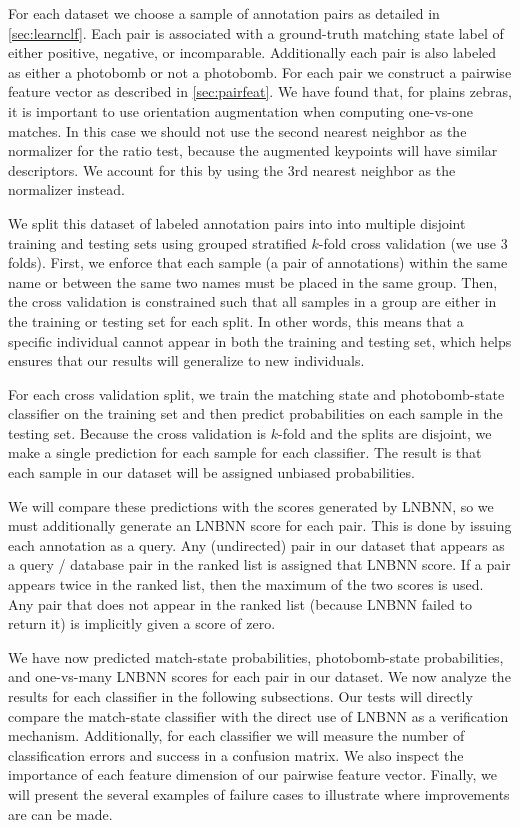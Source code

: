     For each dataset we choose a sample of annotation pairs as detailed in \cref{sec:learnclf}. Each pair is
    associated with a ground-truth matching state label of either positive, negative, or incomparable. Additionally
    each pair is also labeled as either a photobomb or not a photobomb. For each pair we construct a pairwise
    feature vector as described in \cref{sec:pairfeat}. We have found that, for plains zebras, it is important to
    use orientation augmentation when computing one-vs-one matches. In this case we should not use the second
    nearest neighbor as the normalizer for the ratio test, because the augmented keypoints will have similar
    descriptors. We account for this by using the 3rd nearest neighbor as the normalizer instead.

    We split this dataset of labeled annotation pairs into into multiple disjoint training and testing sets using
    grouped stratified $k$-fold cross validation (we use $3$ folds). First, we enforce that each sample (a pair of
    annotations) within the same name or between the same two names must be placed in the same group. Then, the
    cross validation is constrained such that all samples in a group are either in the training or testing set for each
    split. In other words, this means that a specific individual cannot appear in both the training and testing
    set, which helps ensures that our results will generalize to new individuals.

    For each cross validation split, we train the matching state and photobomb-state classifier on the training set
    and then predict probabilities on each sample in the testing set. Because the cross validation is $k$-fold and
    the splits are disjoint, we make a single prediction for each sample for each classifier. The result is that
    each sample in our dataset will be assigned unbiased probabilities.

    We will compare these predictions with the scores generated by LNBNN, so we must additionally generate an
      LNBNN score for each pair.
    This is done by issuing each annotation as a query.
    Any (undirected) pair in our dataset that appears as a query / database pair in the ranked list is assigned
      that LNBNN score.
    If a pair appears twice in the ranked list, then the maximum of the two scores is used.
    Any pair that does not appear in the ranked list (because LNBNN failed to return it) is implicitly given a
      score of zero.

    We have now predicted match-state probabilities, photobomb-state probabilities, and one-vs-many LNBNN scores
    for each pair in our dataset. We now analyze the results for each classifier in the following subsections. Our
    tests will directly compare the match-state classifier with the direct use of LNBNN as a verification
    mechanism. Additionally, for each classifier we will measure the number of classification errors and success in
    a confusion matrix. We also inspect the importance of each feature dimension of our pairwise feature vector.
    Finally, we will present the several examples of failure cases to illustrate where improvements are can be
    made.

